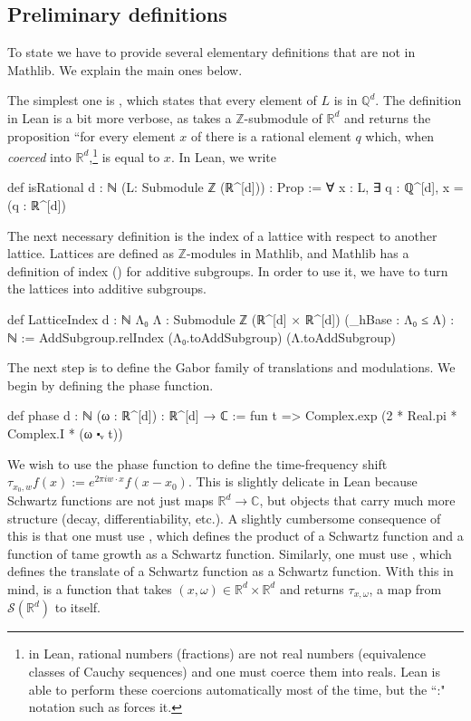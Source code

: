\documentclass[reqno,a4paper,12pt]{amsart}
\numberwithin{equation}{section}
\def\R{{\mathbb R}}
\newcommand{\Rd}{{\R^d}}
\newcommand\1{\mathds{1}}
\begin{document}
\subsection{Preliminary definitions}

To state  we have to provide several elementary definitions that are not in Mathlib. We explain the main ones below. 

The simplest one is , which states that every element of $L$ is in $\mathbb Q^d$. The definition in Lean is a bit more verbose, as  takes a $\mathbb Z$-submodule  of $\mathbb{R}^d$ and returns the proposition ``for every element $x$ of  there is a rational element $q$ which, when \textit{coerced} into $\mathbb{R}^d$,\footnote{in Lean, rational numbers (fractions) are not real numbers (equivalence classes of Cauchy sequences) and one must coerce them into reals. Lean is able to perform these coercions automatically most of the time, but the ``:" notation such as  forces it. } is equal to $x$. In Lean, we write

\begin{leancode}
def isRational {d : ℕ} (L: Submodule ℤ (ℝ^[d])) : Prop := 
  ∀ x : L, ∃ q : ℚ^[d], x = (q : ℝ^[d])
\end{leancode}

The next necessary definition is the index of a lattice with respect to another lattice. Lattices are defined as $\mathbb Z$-modules in Mathlib, and Mathlib has a definition of index () for additive subgroups. In order to use it, we have to turn the lattices into additive subgroups.

\begin{leancode}
def LatticeIndex {d : ℕ}
    {Λ₀ Λ : Submodule ℤ (ℝ^[d] × ℝ^[d])} (_hBase : Λ₀ ≤ Λ) : ℕ :=
  AddSubgroup.relIndex (Λ₀.toAddSubgroup) (Λ.toAddSubgroup)
\end{leancode}


The next step is to define the Gabor family of translations and modulations. We begin by defining the phase function.
\begin{leancode}
def phase {d : ℕ} (ω : ℝ^[d]) : ℝ^[d] → ℂ :=
  fun t => Complex.exp (2 * Real.pi * Complex.I * (ω ⬝ᵥ t))
\end{leancode}

We wish to use the phase function to define the time-frequency shift $\tau_{x_0,w} f(x) := e^{2\pi i w\cdot x }f(x -x_0)$. This is slightly delicate in Lean because Schwartz functions are not just maps $\mathbb R^d \to \mathbb C$, but objects that carry much more structure (decay, differentiability, etc.). A slightly cumbersome consequence of this is that one must use , which defines the product of a Schwartz function and a function of tame growth as a Schwartz function. Similarly, one must use , which defines the translate of a Schwartz function as a Schwartz function. With this in mind,  is a function that takes $(x,\omega) \in \mathbb R^d \times \mathbb R^d$ and returns $\tau_{x,\omega}$, a map from $\mathcal{S}(\Rd)$ to itself.
\end{document}
